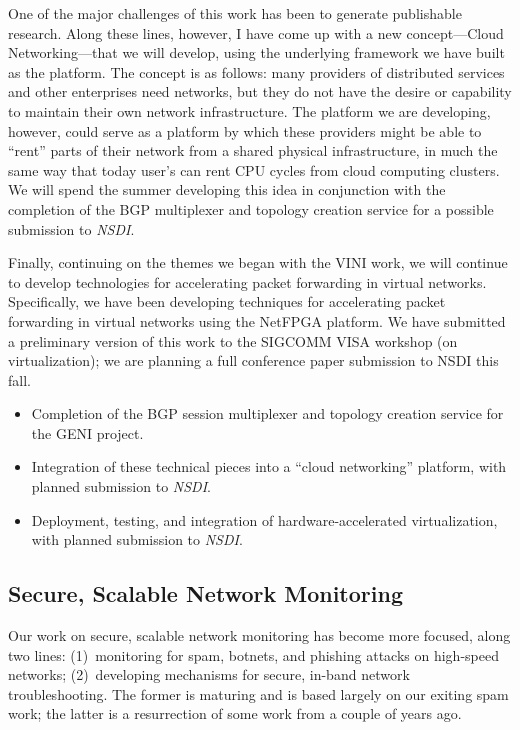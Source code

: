 \begin{sloppypar}
One of the major challenges of this work has been to generate
publishable research.  Along these lines, however, I have come up with a
new concept---Cloud Networking---that we will develop, using the
underlying framework we have built as the platform.  The concept is as
follows: many providers of distributed services and other enterprises
need networks, but they do not have the desire or capability to maintain
their own network infrastructure.  The platform we are developing,
however, could serve as a platform by which these providers might be
able to ``rent'' parts of their network from a shared physical
infrastructure, in much the same way that today user's can rent CPU
cycles from cloud computing clusters.  We will spend the summer
developing this idea in conjunction with the completion of the BGP
multiplexer and topology creation service for a possible submission to
{\em NSDI}.

Finally, continuing on the themes we began with the VINI work, we will
continue to develop technologies for accelerating packet forwarding in
virtual networks.  Specifically, we have been developing techniques for
accelerating packet forwarding in virtual networks using the NetFPGA
platform.  We have submitted a preliminary version of this work to the
SIGCOMM VISA workshop (on virtualization); we are planning a full
conference paper submission to NSDI this fall.


\begin{itemize}
\itemsep=-1pt
\item Completion of the BGP session multiplexer and topology creation
service for the GENI project.
\item Integration of these technical pieces into a ``cloud networking''
platform, with planned submission to {\em NSDI}.
\item Deployment, testing, and integration of hardware-accelerated
virtualization, with planned submission to {\em NSDI}.
\end{itemize}

\subsection*{Secure, Scalable Network Monitoring}

Our work on secure, scalable network monitoring has become more focused,
along two lines: (1)~monitoring for spam, botnets, and phishing attacks
on high-speed networks; (2)~developing mechanisms for secure, in-band
network troubleshooting.  The former is maturing and is based largely on
our exiting spam work; the latter is a resurrection of some work from a
couple of years ago.


\end{sloppypar}
